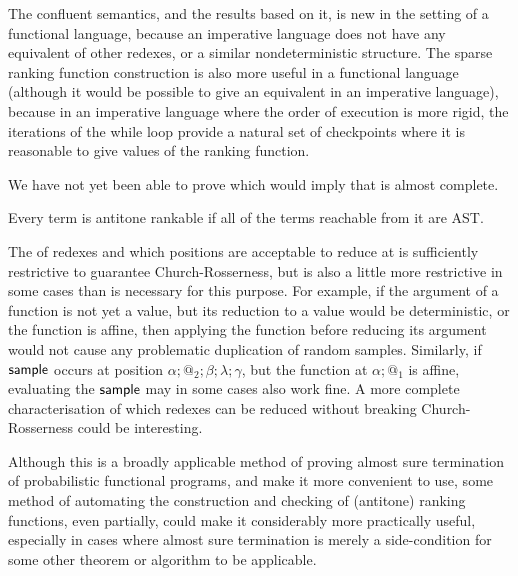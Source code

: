 The confluent semantics, and the results based on it, is new in the setting of a functional language, because an imperative language does not have any equivalent of other redexes, or a similar nondeterministic structure. The sparse ranking function construction is also more useful in a functional language (although it would be possible to give an equivalent in an imperative language), because in an imperative language where the order of execution is more rigid, the iterations of the while loop provide a natural set of checkpoints where it is reasonable to give values of the ranking function.

We have not yet been able to prove  which would imply that  is almost complete.
\begin{conjecture}
\label{conj:antitone}
Every term is antitone rankable if all of the terms reachable from it are AST.
\end{conjecture}

The  of redexes and which positions are acceptable to reduce at is sufficiently restrictive to guarantee Church-Rosserness, but is also a little more restrictive in some cases than is necessary for this purpose. For example, if the argument of a function is not yet a value, but its reduction to a value would be deterministic, or the function is affine, then applying the function before reducing its argument would not cause any problematic duplication of random samples. Similarly, if $\mathsf{sample}$ occurs at position $\alpha;@_2;\beta;\lambda;\gamma$, but the function at $\alpha;@_1$ is affine, evaluating the $\mathsf{sample}$ may in some cases also work fine. A more complete characterisation of which redexes can be reduced without breaking Church-Rosserness could be interesting.

Although this is a broadly applicable method of proving almost sure termination of probabilistic functional programs, and  make it more convenient to use, some method of automating the construction and checking of (antitone) ranking functions, even partially, could make it considerably more practically useful, especially in cases where almost sure termination is merely a side-condition for some other theorem or algorithm to be applicable.
